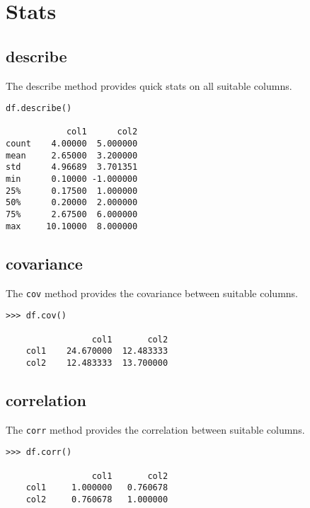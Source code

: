 
\section{Stats}



\subsection{describe}

The describe method provides quick stats on all suitable columns.

\begin{framed}
\begin{verbatim}
df.describe()

            col1      col2
count    4.00000  5.000000
mean     2.65000  3.200000
std      4.96689  3.701351
min      0.10000 -1.000000
25%      0.17500  1.000000
50%      0.20000  2.000000
75%      2.67500  6.000000
max     10.10000  8.000000
\end{verbatim}
\end{framed}

\subsection{covariance}

The \texttt{cov} method provides the covariance between suitable columns.


\begin{framed}
\begin{verbatim}
>>> df.cov()

                 col1       col2
    col1    24.670000  12.483333
    col2    12.483333  13.700000
\end{verbatim}
\end{framed}


\subsection{correlation}

The \texttt{corr} method provides the correlation between suitable columns.
\begin{framed}
	\begin{verbatim}
>>> df.corr()
  
                 col1       col2
    col1     1.000000   0.760678
    col2     0.760678   1.000000
\end{verbatim}
\end{framed}

